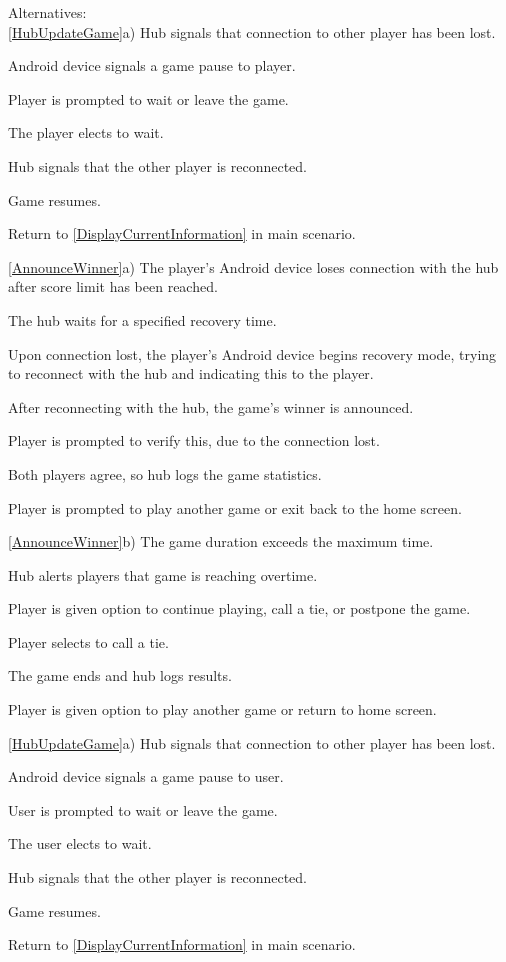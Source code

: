 \documentclass[12pt]{article}
\newenvironment{enumerate*}%
  {\begin{enumerate}%
  	\setlength{\parsep}{0pt}
    \setlength{\itemsep}{0pt}%
    \setlength{\parskip}{0pt}}%
  {\end{enumerate}}
\begin{document}
Alternatives:\\
\ref{HubUpdateGame}a) Hub signals that connection to other player has 
  been lost.
\begin{enumerate*}
\item Android device signals a game pause to player.
\item Player is prompted to wait or leave the game.
\item The player elects to wait.
\item Hub signals that the other player is reconnected.
\item Game resumes.
\item Return to \ref{DisplayCurrentInformation} in main scenario.
\end{enumerate*}
\ref{AnnounceWinner}a) The player's Android device loses connection with 
  the hub after score limit has been reached.
\begin{enumerate*}
\item The hub waits for a specified recovery time.
\item Upon connection lost, the player's Android device begins recovery 
  mode, trying to reconnect with the hub and indicating this to the player.
\item After reconnecting with the hub, the game's winner is announced.  
\item Player is prompted to verify this, due to the connection lost. 
\item Both players agree, so hub logs the game statistics.
\item Player is prompted to play another game or exit back to the home 
  screen.
\end{enumerate*}
\ref{AnnounceWinner}b) The game duration exceeds the maximum time.
\begin{enumerate*}
\item Hub alerts players that game is reaching overtime.
\item Player is given option to continue playing, call a tie, or postpone 
  the game.
\item Player selects to call a tie. 
\item The game ends and hub logs results.
\item Player is given option to play another game or return to home screen.
\end{enumerate*}
\ref{HubUpdateGame}a) Hub signals that connection to other player has been 
  lost.
\begin{enumerate*}
\item Android device signals a game pause to user.
\item User is prompted to wait or leave the game.
\item The user elects to wait.
\item Hub signals that the other player is reconnected.
\item Game resumes.
\item Return to \ref{DisplayCurrentInformation} in main scenario.
\end{enumerate*}
\end{document}

